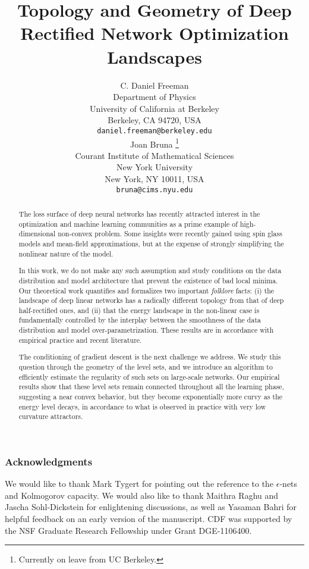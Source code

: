 \documentclass{article} %
\title{Topology and Geometry of Deep Rectified Network Optimization Landscapes }
\author{C. Daniel Freeman  \\
Department of Physics\\
University of California at Berkeley\\
Berkeley, CA 94720, USA \\
\texttt{daniel.freeman@berkeley.edu} \\
\And
Joan Bruna \thanks{Currently on leave from UC Berkeley.} \\
Courant Institute of Mathematical Sciences  \\
New York University \\
New York, NY 10011, USA \\
\texttt{bruna@cims.nyu.edu} \\
}
\begin{document}
\maketitle

\begin{abstract}
The loss surface of deep neural networks has recently attracted interest 
in the optimization and machine learning communities as a prime example of 
high-dimensional non-convex problem. Some insights were recently gained using spin glass 
models and mean-field approximations, but at the expense of strongly simplifying the nonlinear nature of the model.

In this work, we do not make any such assumption and study conditions 
on the data distribution and model architecture that prevent the existence 
of bad local minima. Our theoretical work quantifies and formalizes two 
important \emph{folklore} facts: (i) the landscape of deep linear networks has a radically different topology 
from that of deep half-rectified ones, and (ii) that the energy landscape 
in the non-linear case is fundamentally controlled by the interplay between the smoothness of the data distribution and model over-parametrization. 
These results are in accordance with empirical practice and recent literature. 

The conditioning of gradient descent is the next challenge we address. 
We study this question through the geometry of the level sets, and we introduce
an algorithm to efficiently estimate the regularity of such sets on large-scale networks. 
Our empirical results show that these level sets remain connected throughout 
all the learning phase, suggesting a near convex behavior, but they become 
exponentially more curvy as the energy level decays, in accordance to what is observed in practice with 
very low curvature attractors.
\end{abstract}









  



\subsubsection*{Acknowledgments}

We would like to thank Mark Tygert for pointing out 
the reference to the $\epsilon$-nets and Kolmogorov capacity.  We would also like to thank Maithra Raghu and Jascha Sohl-Dickstein for enlightening discussions, as well as Yasaman Bahri for helpful feedback on an early version of the manuscript.  CDF was supported by the NSF Graduate Research Fellowship under Grant DGE-1106400.
 




\appendix




\end{document}
